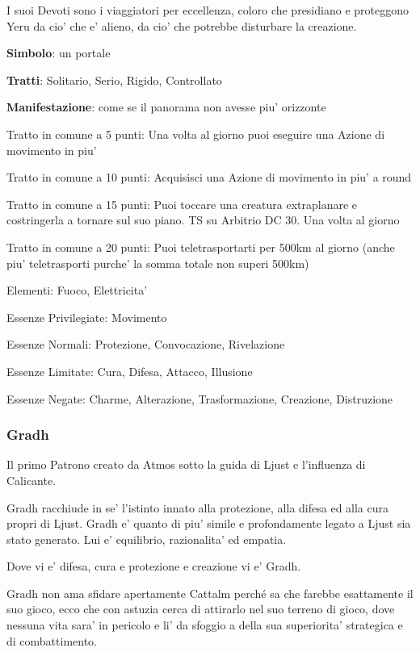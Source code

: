 \documentclass[a4paper,11pt,twoside,openany]{dndbook}
\begin{document}
{I suoi Devoti sono i viaggiatori per eccellenza, coloro che presidiano e proteggono Yeru da cio' che e' alieno, da cio' che potrebbe disturbare la creazione.

\textbf{Simbolo}: un portale

\textbf{Tratti}: Solitario, Serio, Rigido, Controllato

\textbf{Manifestazione}: come se il panorama non avesse piu' orizzonte

\bigskip

Tratto in comune a 5 punti: Una volta al giorno puoi eseguire una Azione di movimento in piu'

Tratto in comune a 10 punti: Acquisisci una Azione di movimento in piu' a round

Tratto in comune a 15 punti: Puoi toccare una creatura extraplanare e costringerla a tornare sul suo piano. TS su Arbitrio DC 30. Una volta al giorno
 
Tratto in comune a 20 punti: Puoi teletrasportarti per 500km al giorno (anche piu' teletrasporti purche' la somma totale non superi 500km)

\bigskip

Elementi: Fuoco, Elettricita'

\bigskip

Essenze Privilegiate: Movimento

Essenze Normali: Protezione, Convocazione, Rivelazione

Essenze Limitate: Cura, Difesa, Attacco, Illusione

Essenze Negate: Charme, Alterazione, Trasformazione, Creazione, Distruzione

\subsubsection{Gradh}

\label{gradh}

Il primo Patrono creato da Atmos sotto la guida di Ljust e l'influenza di Calicante.

Gradh racchiude in se' l'istinto innato alla protezione, alla difesa ed alla cura propri di Ljust. Gradh e' quanto di piu' simile e profondamente legato a Ljust sia stato generato. Lui e' equilibrio, razionalita' ed empatia.

Dove vi e' difesa, cura e protezione e creazione vi e' Gradh.

Gradh non ama sfidare apertamente Cattalm perché sa che farebbe esattamente il suo gioco, ecco che con astuzia cerca di attirarlo nel suo terreno di gioco, dove nessuna vita sara' in pericolo e li' da sfoggio a della sua superiorita' strategica e di combattimento.

}
\end{document}
